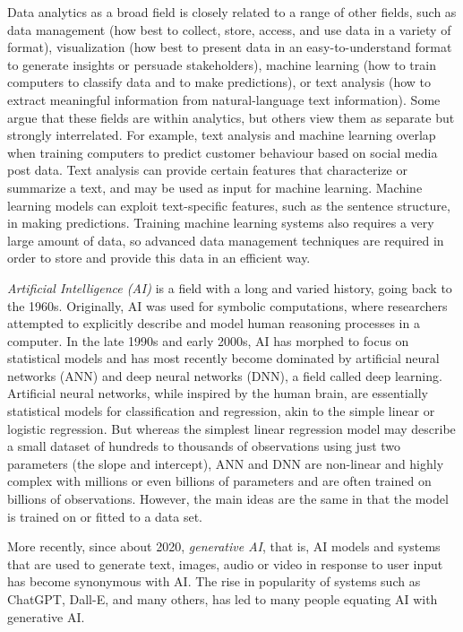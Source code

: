 Data analytics as a broad field is closely related to a range of other fields, such as data management (how best to collect, store, access, and use data in a variety of format), visualization (how best to present data in an easy-to-understand format to generate insights or persuade stakeholders), machine learning (how to train computers to classify data and to make predictions), or text analysis (how to extract meaningful information from natural-language text information). Some argue that these fields are within analytics, but others view them as separate but strongly interrelated. For example, text analysis and machine learning overlap when training computers to predict customer behaviour based on social media post data. Text analysis can provide certain features that characterize or summarize a text, and may be used as input for machine learning. Machine learning models can exploit text-specific features, such as the sentence structure, in making predictions. Training machine learning systems also requires a very large amount of data, so advanced data management techniques are required in order to store and provide this data in an efficient way. 

\emph{Artificial Intelligence (AI)} is a field with a long and varied history, going back to the 1960s. Originally, AI was used for symbolic computations, where researchers attempted to explicitly describe and model human reasoning processes in a computer. In the late 1990s and early 2000s, AI has morphed to focus on statistical models and has most recently become dominated by artificial neural networks (ANN) and deep neural networks (DNN), a field called deep learning. Artificial neural networks, while inspired by the human brain, are essentially statistical models for classification and regression, akin to the simple linear or logistic regression. But whereas the simplest linear regression model may describe a small dataset of hundreds to thousands of observations using just two parameters (the slope and intercept), ANN and DNN are non-linear and highly complex with millions or even billions of parameters and are often trained on billions of observations. However, the main ideas are the same in that the model is trained on or fitted to a data set. 

More recently, since about 2020, \emph{generative AI}, that is, AI models and systems that are used to generate text, images, audio or video in response to user input has become synonymous with AI. The rise in popularity of systems such as ChatGPT, Dall-E, and many others, has led to many people equating AI with generative AI.

